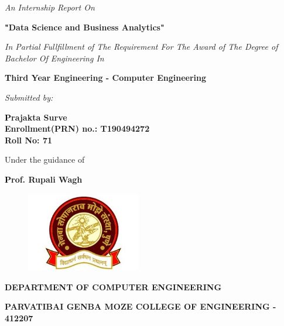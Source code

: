 \thispagestyle{empty}
\centering
\vspace{0.5\baselineskip}
    {\normalsize \textit{An Internship Report On} \par}
\vspace{0.5\baselineskip}
     \Large {\bfseries \textcolor{black}"Data Science and Business Analytics" \par}
\vspace{0.5\baselineskip}
    {\normalsize \textit{In Partial Fullfillment of The Requirement For The Award of The Degree of Bachelor Of Engineering In} \par}
\vspace{0.5\baselineskip}
    {\large \bf \textcolor{black}Third Year Engineering - Computer Engineering\par} 
\vspace{0.5\baselineskip}
    {\normalsize \textit{Submitted by:} \par}
\vspace{0.5\baselineskip}
    {{\large {\bf \textcolor{black}Prajakta Surve \\ Enrollment(PRN) no.: T190494272 \\ Roll No: 71}} \par}
\vspace{1.5\baselineskip}
    {Under the guidance of \par}
\vspace{0.5\baselineskip}
    {\large \bf \textcolor{black}Prof. Rupali Wagh \par}
\vspace{0.5\baselineskip}
    {\begin{figure}[!h] 
	\centering
	\includegraphics[width=50mm]{Media/Logo/logo_utp.jpg} 
     \end{figure}
    }
\vspace{1\baselineskip}
    {\small \bf DEPARTMENT OF \MakeUppercase{Computer Engineering} \par}
\vspace*{0.5ex}
    {\small \bf \uppercase{Parvatibai Genba Moze College of Engineering - 412207} \par}
\vspace{0.25\baselineskip}
